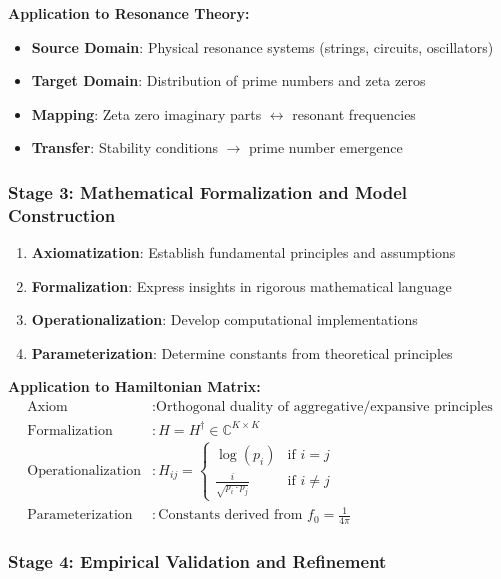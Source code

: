 \textbf{Application to Resonance Theory:}
\begin{itemize}
\item \textbf{Source Domain}: Physical resonance systems (strings, circuits, oscillators)
\item \textbf{Target Domain}: Distribution of prime numbers and zeta zeros
\item \textbf{Mapping}: Zeta zero imaginary parts $\leftrightarrow$ resonant frequencies
\item \textbf{Transfer}: Stability conditions $\rightarrow$ prime number emergence
\end{itemize}

\subsubsection{Stage 3: Mathematical Formalization and Model Construction}

\begin{process}
\begin{enumerate}
\item \textbf{Axiomatization}: Establish fundamental principles and assumptions
\item \textbf{Formalization}: Express insights in rigorous mathematical language
\item \textbf{Operationalization}: Develop computational implementations
\item \textbf{Parameterization}: Determine constants from theoretical principles
\end{enumerate}
\end{process}

\textbf{Application to Hamiltonian Matrix:}
\begin{align}
\text{Axiom} &: \text{Orthogonal duality of aggregative/expansive principles} \\
\text{Formalization} &: H = H^\dagger \in \mathbb{C}^{K \times K} \\
\text{Operationalization} &: H_{ij} = \begin{cases} 
\log(p_i) & \text{if } i = j \\
\frac{i}{\sqrt{p_i \cdot p_j}} & \text{if } i \neq j
\end{cases} \\
\text{Parameterization} &: \text{Constants derived from } f_0 = \frac{1}{4\pi}
\end{align}

\subsubsection{Stage 4: Empirical Validation and Refinement}

